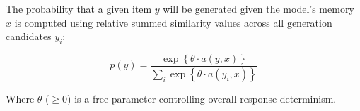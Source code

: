 \documentclass[12pt]{article} \usepackage[letterpaper, margin=1in,
\begin{document}
The probability that a given item $y$ will be generated given the model's memory
$x$ is computed using relative summed similarity values across all generation
candidates $y_i$:

\begin{equation} p(y) = \dfrac { \exp \left \{ \theta \cdot a \left( y, x
\right) \right \} } { \sum_i{ \exp \left \{ \theta \cdot a \left( y_i, x \right)
\right\} } }
\label{eq:packer-choice}
\end{equation}

Where $\theta$ ($\geq 0$) is a free parameter controlling overall response
determinism.
\end{document}
